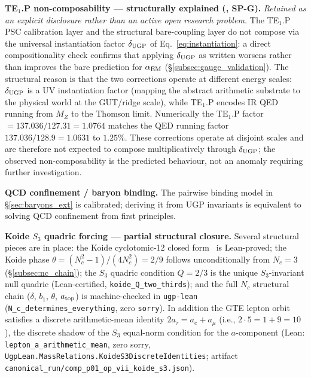 \documentclass[11pt]{article}
\theoremstyle{remark}
\begin{document}
{\begin{description}[leftmargin=2em,labelindent=0.5em,itemsep=0.28em]
  \item[(v$''$)] \textbf{TE$_1$.P non-composability --- structurally explained (\cite{Spivack2026_Uniqueness25}, SP-G).} \emph{Retained as an explicit disclosure rather than an active open research problem.} The TE$_1$.P PSC calibration layer and the structural bare-coupling layer do not compose via the universal instantiation factor $\delta_{\rm UGP}$ of Eq.~\eqref{eq:instantiation}: a direct compositionality check confirms that applying $\delta_{\rm UGP}$ as written worsens rather than improves the bare prediction for $\alpha_{\rm EM}$ (\S\ref{subsec:gauge_validation}).
  The structural reason is that the two corrections operate at different energy scales: $\delta_{\rm UGP}$ is a UV instantiation factor (mapping the abstract arithmetic substrate to the physical world at the GUT/ridge scale), while TE$_1$.P encodes IR QED running from $M_Z$ to the Thomson limit.  Numerically the TE$_1$.P factor $= 137.036/127.31 = 1.0764$ matches the QED running factor $137.036/128.9 = 1.0631$ to $1.25\%$.  These corrections operate at disjoint scales and are therefore not expected to compose multiplicatively through $\delta_{\rm UGP}$; the observed non-composability is the predicted behaviour, not an anomaly requiring further investigation.
  \item[(vi)] \textbf{QCD confinement / baryon binding.} The pairwise binding model in \S\ref{sec:baryons_ext} is calibrated; deriving it from UGP invariants is equivalent to solving QCD confinement from first principles.
  \item[(vii)] \textbf{Koide $S_3$ quadric forcing --- partial structural closure.}
  Several structural pieces are in place:
  the Koide cyclotomic-12 closed form~\cite{Spivack2026_Koide} is Lean-proved;
  the Koide phase $\theta = (N_c^2-1)/(4N_c^2) = 2/9$ follows unconditionally from
  $N_c = 3$ (\S\ref{subsec:nc_chain}); the $S_3$ quadric condition $Q = 2/3$ is
  the unique $S_3$-invariant null quadric (Lean-certified, \texttt{koide\_Q\_two\_thirds});
  and the full $N_c$ structural chain ($\delta$, $b_1$, $\theta$, $a_{\rm top}$) is
  machine-checked in \texttt{ugp-lean} (\texttt{N\_c\_determines\_everything}, zero
  \texttt{sorry}).  In addition the GTE lepton orbit satisfies a discrete
  arithmetic-mean identity $2 a_\tau = a_e + a_\mu$ (i.e., $2 \cdot 5 = 1 + 9 = 10$),
  the discrete shadow of the $S_3$ equal-norm condition for the $a$-component
  (Lean: \texttt{lepton\_a\_arithmetic\_mean}, zero sorry,
  \texttt{UgpLean.MassRelations.KoideS3DiscreteIdentities};
  artifact \texttt{canonical\_run/comp\_p01\_op\_vii\_koide\_s3.json}).

\end{description}}
\end{document}
